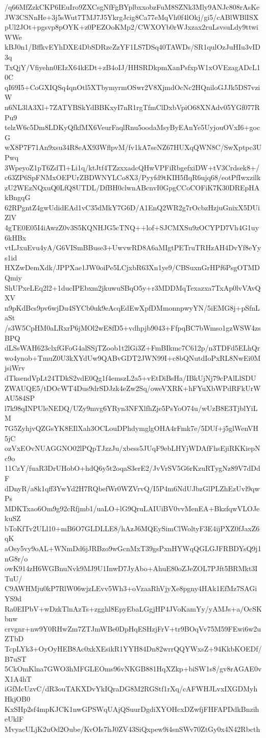 /q66MfZzkCKP6IEuIro9ZXCsgNfFgBYplbxxobzFuM8SZNk3Mly9ANJc808rAsKe
JW3CSNnHe+3j5sWut7TMJ7J5YkrgJcig8Ca77eMqVh0f4lOkj/gi5/cABlWBlISX
pUl2JOt+pgsvp8pOYK+z0PEZOoKMp2/CWXOYb0rWJxzax2ruLsvsuLdy9ttwiWWe
kBJ0n1/BffkvEYhDXE4DbSDRzcZzYF1LS7DSq40TAWDs/SR1qulOzJuHIu3vID3q
TxQjY/Vfiyehn0EIzX64kEDt+zB4oIJ/HHSRDkpmXanPsfxpW1xOVEzagADcL10C
qI69I5+CoGXIQSq4qnOtl5XTbymyrmOSwr2V8XjmdOcNc2HQniloGJJk5DS7vziW
n6NL3lA3Xl+7ZATYBSkYdBBKxyI7nR1rgTfmClDxbVpiO68XNAdv05YGf077RPu9
telzW6c5Dm8LDKyQfkfMX6VeurFaqlRnu5oodaMsyByEAnYe5UyjouOVxI6+gocG
wX8P7F71An9xsu34R8eAX93WflpvM/fv1kA7seNZ67HUXqQWN8C/SwXptpc3UPwq
3WpeyoZ1pT6ZdTl+Li1q/ktJtf4TZzxxadcQHwVPFiRbgefxiDW+tV3Crdsek8+/
c63ZP6SpFNMxOEPUrZBDWNYLCo8X3/Pyyfd9tKIH5fIqR6ujq68/eotPfIwxzilk
zU2WEzNQxuQ0LfQ8UTDL/DfBH0clwnABcnvI0GpgCCoCOFiK7K30DREpHAkBngqG
62RPgntZ4gwUdidEAd1vC35dMkY7G6D/A1EnQ2WR2g7rOcbzHzjuGnixX5DUiZlV
4gTE0E05I4iAwzZ0v3S5KQNHJG5cTNQ++lof+SJCMXSu9zOCYPD7Vh4G1uy6kHBx
vtLJxuEvu4yA/G6VISmBBuse3+UwvwRD8A6aMIgtPETruTRHzAH4DvYf8eYys1id
HXZwDemXdk/JPPXae1JW0oiPe5LCjxbR63Xn1ye9/CBSuxnGrHPf6PsgOTMDQmiy
ShUPxeLEq2l2+1ducIPEbxm2jkuwuSBqO5y+r3MDDMqTexazxa7TxAp0lvVAvQXV
n9pKdBcs9pv6wjDu4SYCb0uk9eAcqEdEwXpfDMmonnpwyYN/5iEMG8j+pSfnLaSt
/s3W5CpHM0aLRxrP6jMOl2wE8fD5+vdhpjb9043+FfpqBC7bWmso1gzWSW4zsBPQ
dLSsWAH623clxfGFoG4alSSjTZoob1t2lGi3Z+FmBIkmc7C612p/n3TDFd5ELhQr
wo4ynob+TmuZ0U3kXYdUw9QABvGDT2JWN99I+c8bQNutdIoPxRL8NwEi0MjsiWrv
dTksendVpLt24TDkS2vdE0Qg1f4emszL2a5+vEtDiBsHa/IBkUjNj79cPAlLlSDU
ZWAUQE5/tDOcWT4Dus9drSDJzk4eZw2Sq/oweVXRK+hFYuXbWPdRFkUrWAU584SP
l7k98qINPUleNEDQ/UZy9mvg6YRyn3NFXlfhZje5PsYoO74u/wUzB8E3TjblYiLM
7G5ZyhjvQZGsYK8EIlXah3OCLouDPhdymglgOHA4rFmk7e/5DUf+j5glWenVH5jC
ozVxEOvNUAGGNO02lPQpTJzzJu/xbess5JUqF9ebLHYjWDAfFhsEjiRKKiepNc9o
11CzY/fuaR3DrUHobO+hdQ6y5t2oqaS3erE2/JvVrSV5G6rKzuRTygNz89V7dDdF
dDnyR/a8k1qff3YwYd2H7RQbefWr0WZVrvQ/I5P4m6NdUJbzGlPLZhEzUvl9qwPs
MDKTxao6Om9g92cRfjmb1/uaLO+lG9QruLAIUiBV0vvMenEA+BkzfqwVLOJekuSZ
bToKfTv2ULl10+mB6O7GLDLLE8/hAzJ6MQEySimClWoltyF3E4ijPXZ0fJaxZ6qK
aOsy5vy9oAL+WNmDd6jJRBzo9wGcnMxT39gsPxnHYWqQGLGJFRBDYsQ9j1nG8r/o
owK914zH6WGBnuNvk9MJ9U1InwD7JyAbo+AhuE80oZJeZOL7PJft5BRMkt3ITuU/
C9AWHMju0kP7RlW06wjzLEvv5Wh3+oVzaaRhVjyXe8pgny4HAk1EfMz7SAGiYS9d
Ra0EIPbV+wDzkTlnAzTs+zgghl8EpyEbaLGgjHP4JVoKamYy/yAMJs+a/OcSKbnw
crvgnr+nw9Y0RHwZm7ZTJmWBe0DpHqESHzjFrV+tr9BOqVv75M59FEwi6w2uZTbD
TcpLYk3+OyOyHEB8Ac0xkXEsikR1YYH84Dn82wrrQQYWxsZ+94KkbKOEDf/B7uST
5CkOmKlna7GWO3hMFGLEOms96vNKGB881HqXZkp+biSW1s8/gv8rAGAE0vX1A4hT
iGfMcUzvC/dR3ouTAKXDvYkIQraDG8M2RGStf1rXq/cAFWHJLvxIXGDMyhHkjOB0
KxSHp2sf4mpKJCK1nwGPSWqUAjQSuurDgdiXYOHcxDZwfjFHFAPDdkBnziheUklF
MvyacULjK2uOd2Oube/KvOIs7hJ0ZV43SiQxpew9i4snSWv70ZtGy0x4N42Rbcth
